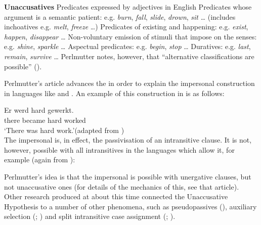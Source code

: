\documentclass[output=paper]{langsci/langscibook}
\begin{document}
\ea\label{ex:19.20} \textbf{Unaccusatives}
    \ea Predicates expressed by adjectives in English
    \ex Predicates whose argument is a semantic patient: e.g. \emph{burn}, \emph{fall}, \emph{slide}, \emph{drown}, \emph{sit} \dots{} (includes inchoatives e.g. \emph{melt}, \emph{freeze} \dots{})
    \ex Predicates of existing and happening: e.g. \emph{exist}, \emph{happen}, \emph{disappear} \dots{}
    \ex Non-voluntary emission of stimuli that impose on the senses: e.g. \emph{shine}, \emph{sparkle} \dots{}
    \ex Aspectual predicates: e.g. \emph{begin}, \emph{stop} \dots{}
    \ex Duratives: e.g. \emph{last}, \emph{remain}, \emph{survive}
    \dots{}\hfill\parencite[162--163]{Perlmutter1978}
    \z
\z
Perlmutter notes, however, that \enquote{alternative classifications are
possible} (\citeyear[163]{Perlmutter1978}).

Perlmutter’s article advances the  in order to explain
the impersonal  construction in languages like  and
. An
example of this construction in  is as follows:

\ea {}
    \sn
    \gll    Er   werd   hard   gewerkt.\\
            there   became   hard   worked\\
    \glt    \enquote*{There was hard work.}\hfill(adapted from \citealt[131]{Zaenen1993})\\
\z
The impersonal  is, in effect, the passivisation of an intransitive
clause. It is not, however, possible with all intransitives in the languages
which allow it, for example (again from ):

\ea {}
\z
Perlmutter’s idea is that the impersonal  is possible with unergative
clauses, but not unaccusative ones (for details of the mechanics of this, see
that article).  Other research produced at about this time connected the
Unaccusative Hypothesis to a number of other phenomena, such as pseudopassives
(\citealt[§6.3]{PerlmutterPostal1984}), auxiliary selection
(\citealt{Burzio1981,Burzio1986}; \citealt{Perlmutter1989}) and split
intransitive case assignment (\citealt[165--166]{Perlmutter1978};
\citealt{Harris1981}).
\end{document}
